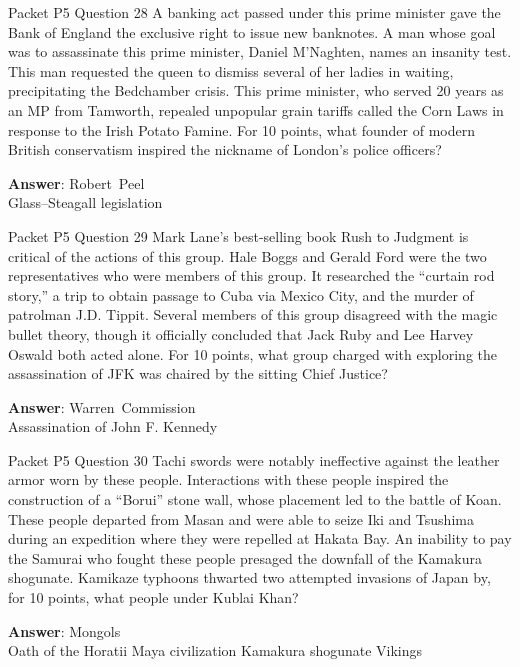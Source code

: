 \begin{frame}{Packet P5 Question 28}
A banking act passed under   this prime minister gave the Bank of England the exclusive right to issue new banknotes. A man whose goal was to assassinate this prime minister, Daniel M'Naghten, names an insanity   test. This man requested the queen to dismiss several   of her ladies in waiting, precipitating the Bedchamber crisis. This prime minister, who served 20 years as an MP from Tamworth, repealed unpopular grain tariffs called the Corn Laws in response to the Irish Potato Famine. For 10 points, what   founder of modern British conservatism   inspired the nickname of London's police officers?

\textbf{Answer}: Robert\ Peel\\
 Glass–Steagall legislation
\end{frame}

\begin{frame}{Packet P5 Question 29}
Mark Lane’s best-selling book Rush to Judgment is critical of the actions of this group. Hale Boggs and     Gerald Ford were the   two representatives who were members of this group. It researched the ``curtain rod story,'' a trip to obtain passage to Cuba via Mexico City, and the murder of patrolman J.D. Tippit. Several members   of this group disagreed with the magic bullet theory, though it officially concluded that Jack Ruby and Lee Harvey Oswald both acted alone.   For 10 points, what group charged with exploring the assassination of JFK was chaired by the sitting Chief Justice?

\textbf{Answer}: Warren\ Commission\\
 Assassination of John F. Kennedy
\end{frame}

\begin{frame}{Packet P5 Question 30}
Tachi swords were notably   ineffective against the leather armor worn by these people. Interactions with these people inspired the construction of a ``Borui'' stone wall, whose placement led to the battle of Koan. These people departed from Masan and were able to seize Iki and Tsushima during an expedition where they were repelled at Hakata Bay. An inability to pay   the Samurai who fought these people presaged the downfall of the Kamakura shogunate.   Kamikaze typhoons thwarted two attempted invasions of Japan by, for 10 points, what people under Kublai Khan?    

\textbf{Answer}: Mongols\\
 Oath of the Horatii
 Maya civilization
 Kamakura shogunate
 Vikings
\end{frame}

